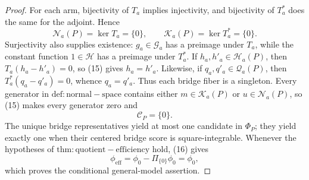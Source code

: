 \documentclass{article}
\begin{document}
\begin{proof}
For each arm, bijectivity of \(T_a\) implies injectivity, and bijectivity of \(T_a^*\) does the same for the adjoint.  Hence
\[
 \mathcal N_a(P)=\ker T_a=\{0\},
 \qquad
 \mathcal K_a(P)=\ker T_a^*=\{0\}.                                \tag{15}
\]
Surjectivity also supplies existence: \(g_a\in\mathcal G_a\) has a preimage under \(T_a\), while the constant function \(1\in\mathcal H\) has a preimage under \(T_a^*\).  If \(h_a,h'_a\in\mathcal H_a(P)\), then \(T_a(h_a-h'_a)=0\), so (15) gives \(h_a=h'_a\).  Likewise, if \(q_a,q'_a\in\mathcal Q_a(P)\), then \(T_a^*(q_a-q'_a)=0\), whence \(q_a=q'_a\).  Thus each bridge fiber is a singleton.  Every generator in \(\mathrm{def:normal-space}\) contains either \(m\in\mathcal K_a(P)\) or \(u\in\mathcal N_a(P)\), so (15) makes every generator zero and
\[
 \mathcal C_P=\{0\}.                                                \tag{16}
\]
The unique bridge representatives yield at most one candidate in \(\Phi_P\); they yield exactly one when their centered bridge score is square-integrable.  Whenever the hypotheses of \(\mathrm{thm:quotient-efficiency}\) hold, (16) gives
\[
 \phi_{\mathrm{eff}}
 =\phi_0-\Pi_{\{0\}}\phi_0=\phi_0,
\]
which proves the conditional general-model assertion.


\end{proof}
\end{document}

